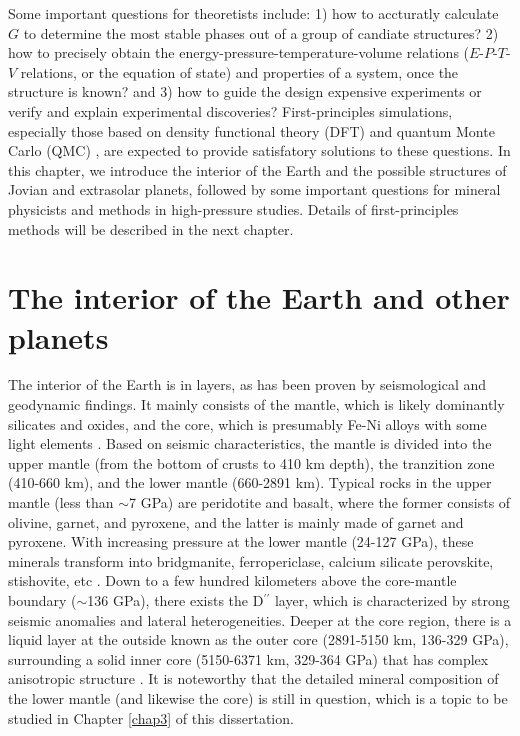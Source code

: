 Some important questions for theoretists include: 1) how to accturatly calculate $G$ to determine the most stable phases out of a group of candiate structures? 2) how to precisely obtain the energy-pressure-temperature-volume relations ($E$-$P$-$T$-$V$ relations, or the equation of state) and properties of a system, once the structure is known? and 3) how to guide the design expensive experiments or verify and explain experimental discoveries? First-principles simulations, especially those based on density functional theory (DFT) \cite{ks1965} and quantum Monte Carlo (QMC) \cite{Ceperley2010}, are expected to provide satisfatory solutions to these questions. In this chapter, we introduce the interior of the Earth and the possible structures of Jovian and extrasolar planets, followed by some important questions for mineral physicists and methods in high-pressure studies. Details of first-principles methods will be described in the next chapter.

\section{The interior of the Earth and other planets}
The interior of the Earth is in layers, as has been proven by seismological and geodynamic findings. It mainly consists of the mantle, which is likely dominantly silicates and oxides, and the core, which is presumably Fe-Ni alloys with some light elements \cite{Birch1952,Mcdonough1995}. Based on seismic characteristics, the mantle is divided into the upper mantle (from the bottom of crusts to 410 km depth), the tranzition zone (410-660 km), and the lower mantle (660-2891 km). Typical rocks in the upper mantle (less than $\sim$7 GPa) are peridotite and basalt, where the former consists of olivine, garnet, and pyroxene, and the latter is mainly made of garnet and pyroxene. With increasing pressure at the lower mantle (24-127 GPa), these minerals transform into bridgmanite, ferropericlase, calcium silicate perovskite, stishovite, etc \cite{Trønnes2010}. Down to a few hundred kilometers above the core-mantle boundary ($\sim$136 GPa), there exists the D$^{\prime\prime}$ layer, which is characterized by strong seismic anomalies and lateral heterogeneities. Deeper at the core region, there is a liquid layer at the outside known as the outer core (2891-5150 km, 136-329 GPa), surrounding a solid inner core (5150-6371 km, 329-364 GPa) that has complex anisotropic structure \cite{Mattesini2010}. It is noteworthy that the detailed mineral composition of the lower mantle (and likewise the core) is still in question, which is a topic to be studied in Chapter \ref{chap3} of this dissertation.

